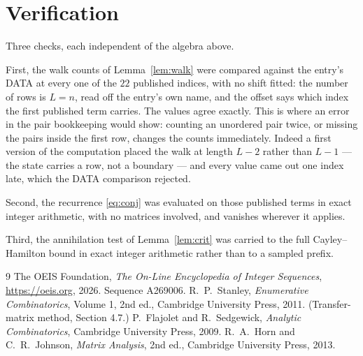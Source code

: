 \documentclass[11pt,a4paper]{article}
\theoremstyle{plain}
\theoremstyle{definition}
\begin{document}
\section{Verification}

Three checks, each independent of the algebra above.

First, the walk counts of Lemma~\ref{lem:walk} were compared against the entry's DATA at
every one of the $22$ published indices, with no shift fitted: the number of rows is
$L=n$, read off the entry's own name, and the offset says which index the first
published term carries. The values agree exactly. This is where an error in the pair
bookkeeping would show: counting an unordered pair twice, or missing the pairs inside the
first row, changes the counts immediately. Indeed a first version of the computation
placed the walk at length $L-2$ rather than $L-1$ --- the state carries a row, not a
boundary --- and every value came out one index late, which the DATA comparison rejected.

Second, the recurrence \eqref{eq:conj} was evaluated on those published terms in exact
integer arithmetic, with no matrices involved, and vanishes wherever it applies.

Third, the annihilation test of Lemma~\ref{lem:crit} was carried to the full
Cayley--Hamilton bound in exact integer arithmetic rather than to a sampled prefix.

\begin{thebibliography}{9}
 The OEIS Foundation, \emph{The On-Line Encyclopedia of Integer
Sequences}, \url{https://oeis.org}, 2026. Sequence A269006.
 R.~P.~Stanley, \emph{Enumerative Combinatorics}, Volume 1, 2nd ed.,
Cambridge University Press, 2011. (Transfer-matrix method, Section 4.7.)
 P.~Flajolet and R.~Sedgewick, \emph{Analytic Combinatorics}, Cambridge
University Press, 2009.
 R.~A.~Horn and C.~R.~Johnson, \emph{Matrix Analysis}, 2nd ed., Cambridge
University Press, 2013.
\end{thebibliography}
\end{document}
